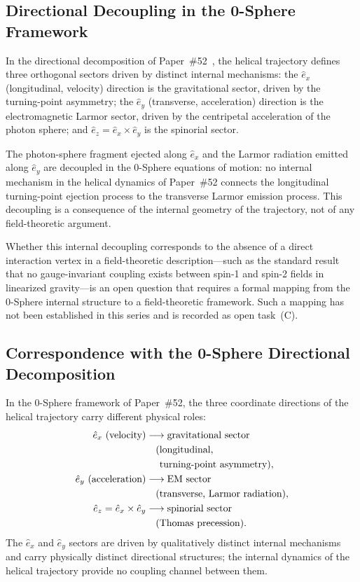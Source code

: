 \documentclass[%
 reprint, amsmath,amssymb, aps, prd, ]{revtex4-2}
\numberwithin{equation}{section}
\newcommand{\ehat}[1]{\hat{e}_{#1}}
\begin{document}
\subsection{Directional Decoupling in the 0-Sphere Framework}

In the directional decomposition of Paper~\#52~\cite{hanamura52}, the helical trajectory defines three orthogonal sectors driven by distinct internal mechanisms:
the $\ehat{x}$ (longitudinal, velocity) direction is the gravitational sector, driven by the turning-point asymmetry;
the $\ehat{y}$ (transverse, acceleration) direction is the electromagnetic Larmor sector, driven by the centripetal acceleration of the photon sphere;
and $\ehat{z} = \ehat{x}\times\ehat{y}$ is the spinorial sector.

The photon-sphere fragment ejected along $\ehat{x}$ and the Larmor radiation emitted along $\ehat{y}$ are decoupled in the 0-Sphere equations of motion:
no internal mechanism in the helical dynamics of Paper~\#52 connects the longitudinal turning-point ejection process to the transverse Larmor emission process.
This decoupling is a consequence of the internal geometry of the trajectory, not of any field-theoretic argument.

Whether this internal decoupling corresponds to the absence of a direct interaction vertex in a field-theoretic description---such as the standard result that no gauge-invariant coupling exists between spin-1 and spin-2 fields in linearized gravity---is an open question that requires a formal mapping from the 0-Sphere internal structure to a field-theoretic framework.
Such a mapping has not been established in this series and is recorded as open task~(C).

\subsection{Correspondence with the 0-Sphere Directional Decomposition}

In the 0-Sphere framework of Paper~\#52, the three coordinate directions of the helical trajectory carry different physical roles:
\begin{align}
\ehat{x}\ (\text{velocity})
&\longrightarrow \text{gravitational sector}
\notag\\
&\quad (\text{longitudinal,}
\notag\\
&\quad\phantom{(}\text{turning-point asymmetry}),
\label{eq:ex_grav}\\
\ehat{y}\ (\text{acceleration})
&\longrightarrow \text{EM sector}
\notag\\
&\quad (\text{transverse, Larmor radiation}),
\label{eq:ey_EM}\\
\ehat{z} = \ehat{x}\times\ehat{y}
&\longrightarrow \text{spinorial sector}
\notag\\
&\quad (\text{Thomas precession}).
\label{eq:ez_spin}
\end{align}
The $\ehat{x}$ and $\ehat{y}$ sectors are driven by qualitatively distinct internal mechanisms and carry physically distinct directional structures;
the internal dynamics of the helical trajectory provide no coupling channel between them.
\end{document}
